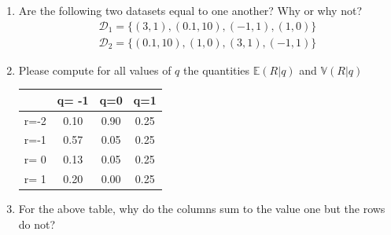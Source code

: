 \begin{enumerate}
    \item Are the following two datasets equal to one another? Why or why not? 
    \begin{align}
        \mathcal{D}_{1} = \{ (3,1),(0.1,10),(-1,1),(1,0) \}\\
        \mathcal{D}_{2} = \{(0.1,10), (1,0),(3,1),(-1,1) \}
    \end{align}
    \item Please compute for all values of $q$ the quantities $\mathbb{E}(R|q)$ and $\mathbb{V}(R|q)$
    \begin{table}[ht!]
        \centering
        \begin{tabular}{c|ccc}
             & q= -1 & q=0 & q=1  \\
             \hline
        r=-2 & 0.10  & 0.90 & 0.25 \\
        r=-1 & 0.57  & 0.05 & 0.25 \\
        r= 0 & 0.13  & 0.05 & 0.25 \\
        r= 1 & 0.20  & 0.00 & 0.25 \\
        \end{tabular}
    \end{table}
    \item For the above table, why do the columns sum to the value one but the rows do not?
    

\end{enumerate}
